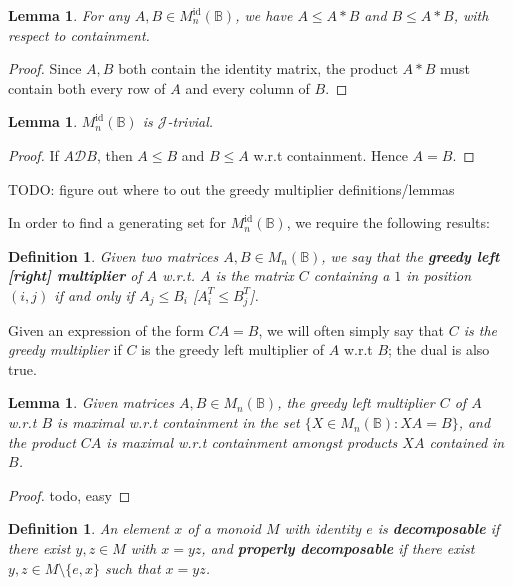 \documentclass[11pt]{article}
\newtheorem{lemma}[thm]{Lemma}
\newtheorem{defi}[thm]{Definition}
\newcommand{\defn}[1]{\textbf{\textit{#1}}}
\numberwithin{equation}{section}
\newcommand{\set}[2]{\ensuremath{\{#1 : #2 \}}}
\newcommand{\B}{\mathbb{B}}
\newcommand{\Bn}{M_n(\B)}
\newcommand{\Refn}{M_n^{\text{id}}(\B)}
\newcommand{\D}{\mathscr{D}}
\newcommand{\J}{\mathscr{J}}
\begin{document}
\begin{lemma}
  For any $A, B \in \Refn$, we have $A \leq A * B$ and $B \leq A * B$, with
  respect to containment.
\end{lemma}
\begin{proof}
  Since $A, B$ both contain the identity matrix, the product $A * B$ must
  contain both every row of $A$ and every column of $B$.
\end{proof}

\begin{lemma}
  $\Refn$ is $\J$-trivial. 
\end{lemma}
\begin{proof}
  If $A \D B$, then $A \leq B$ and $B \leq A$ w.r.t containment. Hence $A = B$.    
\end{proof}

TODO: figure out where to out the greedy multiplier definitions/lemmas

In order to find a generating set for $\Refn$, we require the following results:

\begin{defi}
  Given two matrices $A, B \in \Bn$, we say that the \textbf{\textit{greedy
  left [right] multiplier}} of $A$ w.r.t. $A$ is the matrix $C$ containing a $1$
  in position $(i, j)$ if and only if $A_j \leq B_i$ [$A^T_i \leq B^T_j$].
\end{defi}

Given an expression of the form $CA = B$, we will often simply say that
\textit{$C$ is the greedy multiplier} if $C$ is the greedy left multiplier
of $A$ w.r.t $B$; the dual is also true.

\begin{lemma}
  Given matrices $A, B \in \Bn$, the greedy left multiplier $C$ of $A$ w.r.t $B$
  is maximal w.r.t  containment in the set $\set{X \in \Bn}{XA = B}$, and the
  product $CA$ is maximal w.r.t containment amongst products $XA$ contained in
  $B$.
\end{lemma}
\begin{proof}
  todo, easy
\end{proof}

\begin{defi}
  An element $x$ of a monoid $M$ with identity $e$ is \defn{decomposable} if
  there exist $y, z \in M$ with $x = yz$, and \defn{properly decomposable} if
  there exist $y, z \in M\setminus\{e, x\}$ such that $x = yz$.
\end{defi}
\end{document}
